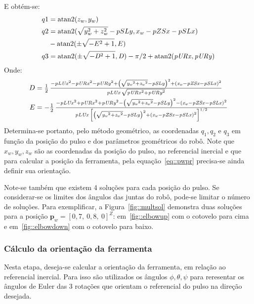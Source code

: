 %
E obtém-se:
%
\begin{align}
	q1 &= \operatorname{atan2} (z_w,y_w) \label{eq::q1ik} \\
	q2 &= \operatorname{atan2} ( \sqrt {y_w^2 + z_w^2}- pSLy, x_w - pZSx - pSLx ) \nonumber \\
	   &- \operatorname{atan2} ( \pm \sqrt {-E^2+1}, E ) \\
	q3 &= \operatorname{atan2} ( \pm \sqrt {-{{\it D}}^{2}+1},{\it D} ) -\pi /2 +
\operatorname{atan2} ( {\it pURx},{\it pURy} ) \label{eq::q3ik}
\end{align}
%
Onde:
%
\begin{align}
	D &= \textstyle \frac{1}{2}\,{\frac {-{{\it pLUx}}^{2}-{{\it pURx}}^{2}-{{\it
	pURy}}^{2}+ \left( \sqrt {{{\it y_w}}^{2}+{{\it z_w}}^{2}}-{\it pSLy} \right) ^{2
		}+ \left( {\it x_w}-{\it pZSx}-{\it pSLx} \right) ^{2}}{{\it pLUx}\,
		\sqrt {{{\it pURx}}^{2}+{{\it pURy}}^{2}}}} \\
	E &= \textstyle {-\frac{1}{2}\,{\frac {-{{\it pLUx}}^{2}+{{\it pURx}}^{2}+{{\it
		pURy}}^{2}- \left( \sqrt {{{\it y_w}}^{2}+{{\it z_w}}^{2}}-{\it pSLy} \right)
		^{2 }- \left( {\it x_w}-{\it pZSx}-{\it pSLx} \right) ^{2}}{{\it pLUx}\,
		\left[ \left( \sqrt {{{\it y_w}}^{2}+{{\it z_w}}^{2}}-{\it pSLy}
 		\right) ^{2}+ \left( {\it x_w}-{\it pZSx}-{\it pSLx} \right) ^{2}
 		\right]^{1/2}}}}
\end{align}
%
Determina-se portanto, pelo método geométrico, as coordenadas $q_1, q_2$ e
$q_3$ em função da posição do pulso e dos parâmetros geométricos do robô. Note que $x_w,
y_w, z_w$ são as coordenadas da posição do pulso, no referencial inercial e que
para calcular a posição da ferramenta, pela equação~\ref{eq::pwpr} precisa-se
ainda definir sua orientação.

Note-se também que existem 4 soluções para cada posição do pulso. Se
considerar-se os limites dos ângulos das juntas do robô, pode-se limitar o
número de soluções. Para exemplificar, a Figura~\ref{fig::multsol} demonstra
duas soluções para a posição $\mathbf{p}_{w} = [0,7,~ 0,8,~ 0]^Z$:
em~\ref{fig::elbowup} com o cotovelo para cima e em~\ref{fig::elbowdown} com o
cotovelo para baixo.



\subsubsection{Cálculo da orientação da ferramenta}

Nesta etapa, deseja-se calcular a orientação da ferramenta, em relação ao
referencial inercial. Para isso são utilizados os ângulos $\phi,\theta,\psi$
para reresentar os ângulos de Euler das 3 rotações que orientam o referencial do
pulso na direção desejada.

